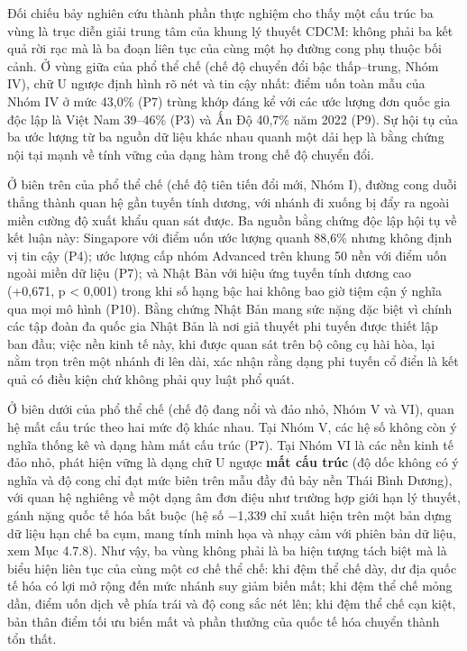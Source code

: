 \documentclass[
  a4paper,
  13pt]{extreport}
\begin{document}
Đối chiếu bảy nghiên cứu thành phần thực nghiệm cho thấy một cấu trúc ba
vùng là trục diễn giải trung tâm của khung lý thuyết CDCM: không phải ba
kết quả rời rạc mà là ba đoạn liên tục của cùng một họ đường cong phụ
thuộc bối cảnh. Ở vùng giữa của phổ thể chế (chế độ chuyển đổi bậc
thấp--trung, Nhóm IV), chữ U ngược định hình rõ nét và tin cậy nhất:
điểm uốn toàn mẫu của Nhóm IV ở mức 43,0\% (P7) trùng khớp đáng kể với
các ước lượng đơn quốc gia độc lập là Việt Nam 39--46\% (P3) và Ấn Độ
40,7\% năm 2022 (P9). Sự hội tụ của ba ước lượng từ ba nguồn dữ liệu
khác nhau quanh một dải hẹp là bằng chứng nội tại mạnh về tính vững của
dạng hàm trong chế độ chuyển đổi.

Ở biên trên của phổ thể chế (chế độ tiên tiến đổi mới, Nhóm I), đường
cong duỗi thẳng thành quan hệ gần tuyến tính dương, với nhánh đi xuống
bị đẩy ra ngoài miền cường độ xuất khẩu quan sát được. Ba nguồn bằng
chứng độc lập hội tụ về kết luận này: Singapore với điểm uốn ước lượng
quanh 88,6\% nhưng không định vị tin cậy (P4); ước lượng cấp nhóm
Advanced trên khung 50 nền với điểm uốn ngoài miền dữ liệu (P7); và Nhật
Bản với hiệu ứng tuyến tính dương cao (+0,671, p \textless{} 0,001)
trong khi số hạng bậc hai không bao giờ tiệm cận ý nghĩa qua mọi mô hình
(P10). Bằng chứng Nhật Bản mang sức nặng đặc biệt vì chính các tập đoàn
đa quốc gia Nhật Bản là nơi giả thuyết phi tuyến được thiết lập ban đầu;
việc nền kinh tế này, khi được quan sát trên bộ công cụ hài hòa, lại nằm
trọn trên một nhánh đi lên dài, xác nhận rằng dạng phi tuyến cổ điển là
kết quả có điều kiện chứ không phải quy luật phổ quát.

Ở biên dưới của phổ thể chế (chế độ đang nổi và đảo nhỏ, Nhóm V và VI),
quan hệ mất cấu trúc theo hai mức độ khác nhau. Tại Nhóm V, các hệ số
không còn ý nghĩa thống kê và dạng hàm mất cấu trúc (P7). Tại Nhóm VI là
các nền kinh tế đảo nhỏ, phát hiện vững là dạng chữ U ngược \textbf{mất
cấu trúc} (độ dốc không có ý nghĩa và độ cong chỉ đạt mức biên trên mẫu
đầy đủ bảy nền Thái Bình Dương), với quan hệ nghiêng về một dạng âm đơn
điệu như trường hợp giới hạn lý thuyết, gánh nặng quốc tế hóa bắt buộc
(hệ số −1,339 chỉ xuất hiện trên một bản dựng dữ liệu hạn chế ba cụm,
mang tính minh họa và nhạy cảm với phiên bản dữ liệu, xem Mục 4.7.8).
Như vậy, ba vùng không phải là ba hiện tượng tách biệt mà là biểu hiện
liên tục của cùng một cơ chế thể chế: khi đệm thể chế dày, dư địa quốc
tế hóa có lợi mở rộng đến mức nhánh suy giảm biến mất; khi đệm thể chế
mỏng dần, điểm uốn dịch về phía trái và độ cong sắc nét lên; khi đệm thể
chế cạn kiệt, bản thân điểm tối ưu biến mất và phần thưởng của quốc tế
hóa chuyển thành tổn thất.
\end{document}
